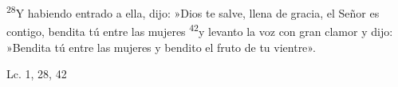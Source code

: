 \documentclass[../../rosario.tex]{subfiles}
\begin{document}
    \textsuperscript{28}Y habiendo entrado a ella, dijo: »Dios te salve, llena de gracia, el Señor es contigo, bendita tú entre las mujeres 
    \textsuperscript{42}y levanto la voz con gran clamor y dijo: »Bendita tú entre las mujeres y bendito el fruto de tu vientre».
    \begin{flushright}
    Lc. 1, 28, 42
    \end{flushright}
\end{document}

